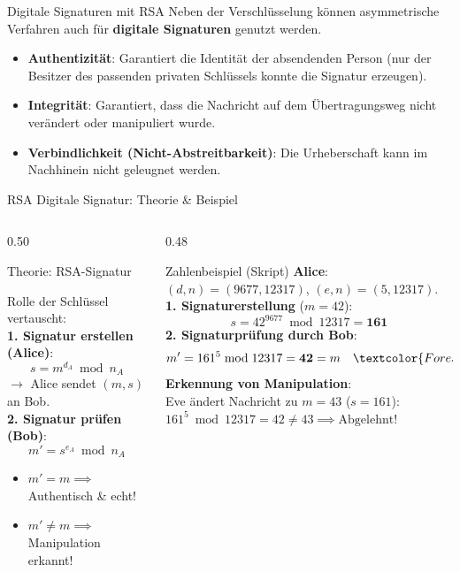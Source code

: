 \begin{frame}{Digitale Signaturen mit RSA}
	Neben der Verschlüsselung können asymmetrische Verfahren auch für \textbf{digitale Signaturen} genutzt werden.
	\pause
	\begin{mydefinition}
		\pause
		\begin{itemize}[<+->]
			\item \textbf{Authentizität}: Garantiert die Identität der absendenden Person (nur der Besitzer des passenden privaten Schlüssels konnte die Signatur erzeugen).
			\item \textbf{Integrität}: Garantiert, dass die Nachricht auf dem Übertragungsweg nicht verändert oder manipuliert wurde.
			\item \textbf{Verbindlichkeit (Nicht-Abstreitbarkeit)}: Die Urheberschaft kann im Nachhinein nicht geleugnet werden.
		\end{itemize}
	\end{mydefinition}
\end{frame}

\begin{frame}{RSA Digitale Signatur: Theorie \& Beispiel}
	\begin{columns}[T]
		\begin{column}{0.50\textwidth}
			\begin{block}{Theorie: RSA-Signatur}
				{\scriptsize
				Rolle der Schlüssel vertauscht:\\[0.3em]
				\textbf{1. Signatur erstellen (Alice)}:
				\[ s = m^{d_A} \bmod n_A \]
				$\rightarrow$ Alice sendet $(m, s)$ an Bob.\\[0.3em]
				\textbf{2. Signatur prüfen (Bob)}:
				\[ m' = s^{e_A} \bmod n_A \]
				\begin{itemize}
					\item $m' = m \implies$ Authentisch \& echt! \textcolor{ForestGreen}{\checkmark}
					\item $m' \neq m \implies$ Manipulation erkannt! \textcolor{BrickRed}{\textbf{\faTimes}}
				\end{itemize}
				}
			\end{block}
		\end{column}
		\begin{column}{0.48\textwidth}
			\begin{exampleblock}{Zahlenbeispiel (Skript)}
				{\scriptsize
				\textbf{Alice}: $(d, n) = (9677, 12317)$, $(e, n) = (5, 12317)$.\\[0.3em]
				\textbf{1. Signaturerstellung} ($m = 42$):
				\[ s = 42^{9677} \bmod 12317 = \mathbf{161} \]
				\textbf{2. Signaturprüfung durch Bob}:
				\[ m' = 161^5 \bmod 12317 = \mathbf{42} = m \quad \textcolor{ForestGreen}{\mathbf{\checkmark}} \]
				\textbf{Erkennung von Manipulation}:\\
				Eve ändert Nachricht zu $m = 43$ ($s = 161$):\\
				$161^5 \bmod 12317 = 42 \neq 43 \implies \text{Abgelehnt!}$
				}
			\end{exampleblock}
		\end{column}
	\end{columns}
\end{frame}

